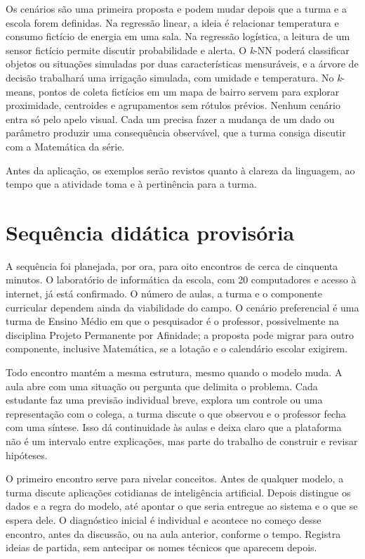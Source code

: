 Os cenários são uma primeira proposta e podem mudar depois que a turma e a escola forem definidas. Na regressão linear, a ideia é relacionar temperatura e consumo fictício de energia em uma sala. Na regressão logística, a leitura de um sensor fictício permite discutir probabilidade e alerta. O \textit{k}-NN poderá classificar objetos ou situações simuladas por duas características mensuráveis, e a árvore de decisão trabalhará uma irrigação simulada, com umidade e temperatura. No \textit{k}-means, pontos de coleta fictícios em um mapa de bairro servem para explorar proximidade, centroides e agrupamentos sem rótulos prévios. Nenhum cenário entra só pelo apelo visual. Cada um precisa fazer a mudança de um dado ou parâmetro produzir uma consequência observável, que a turma consiga discutir com a Matemática da série.

Antes da aplicação, os exemplos serão revistos quanto à clareza da linguagem, ao tempo que a atividade toma e à pertinência para a turma.

\section{Sequência didática provisória}

A sequência foi planejada, por ora, para oito encontros de cerca de cinquenta minutos. O laboratório de informática da escola, com 20 computadores e acesso à internet, já está confirmado. O número de aulas, a turma e o componente curricular dependem ainda da viabilidade do campo. O cenário preferencial é uma turma de Ensino Médio em que o pesquisador é o professor, possivelmente na disciplina Projeto Permanente por Afinidade; a proposta pode migrar para outro componente, inclusive Matemática, se a lotação e o calendário escolar exigirem.

Todo encontro mantém a mesma estrutura, mesmo quando o modelo muda. A aula abre com uma situação ou pergunta que delimita o problema. Cada estudante faz uma previsão individual breve, explora um controle ou uma representação com o colega, a turma discute o que observou e o professor fecha com uma síntese. Isso dá continuidade às aulas e deixa claro que a plataforma não é um intervalo entre explicações, mas parte do trabalho de construir e revisar hipóteses.

O primeiro encontro serve para nivelar conceitos. Antes de qualquer modelo, a turma discute aplicações cotidianas de inteligência artificial. Depois distingue os dados e a regra do modelo, até apontar o que seria entregue ao sistema e o que se espera dele. O diagnóstico inicial é individual e acontece no começo desse encontro, antes da discussão, ou na aula anterior, conforme o tempo. Registra ideias de partida, sem antecipar os nomes técnicos que aparecem depois.

